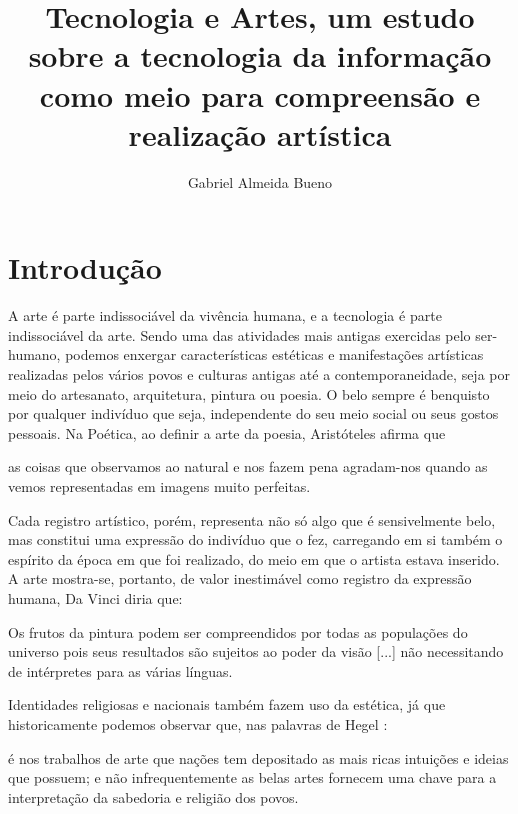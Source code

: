 \documentclass[12pt, a4paper]{article}
\author{Gabriel Almeida Bueno}
\affil{FATEC Zona Sul}
\title{Tecnologia e Artes, um estudo sobre a tecnologia da informação como meio para compreensão e realização artística}
\begin{document}
\maketitle

\section{Introdução}
A arte é parte indissociável da vivência humana, e a tecnologia é parte indissociável da arte. 
Sendo uma das atividades mais antigas exercidas pelo ser-humano, podemos enxergar características estéticas e manifestações artísticas realizadas pelos vários povos e culturas antigas até a contemporaneidade, seja por meio do artesanato, arquitetura, pintura ou poesia.
O belo sempre é benquisto por qualquer indivíduo que seja, independente do seu meio social ou seus gostos pessoais.
Na Poética, ao definir a arte da poesia, Aristóteles \cite[p.42]{aristotle_poetics} afirma que 

\begin{displayquote}
as coisas que observamos ao natural e nos fazem pena agradam-nos quando as vemos representadas em imagens muito perfeitas.
\end{displayquote}

Cada registro artístico, porém, representa não só algo que é sensivelmente belo, mas constitui uma expressão do indivíduo que o fez, carregando em si
também o espírito da época em que foi realizado, do meio em que o artista estava inserido. 
A arte mostra-se, portanto, de valor inestimável como registro da expressão humana, Da Vinci \cite{davinci_thoughtsonart} diria que:

\begin{displayquote}
Os frutos da pintura podem ser compreendidos por todas as populações do universo pois seus resultados
são sujeitos ao poder da visão [...] não necessitando de intérpretes para as várias línguas.
\end{displayquote}

Identidades religiosas e nacionais também fazem uso da estética, já que historicamente podemos observar que, nas palavras de Hegel \cite{hegel}:

\begin{displayquote}
é nos trabalhos de arte que nações tem depositado as mais ricas intuições e ideias que possuem; e não 
infrequentemente as belas artes fornecem uma chave para a interpretação da sabedoria e religião dos povos.
\end{displayquote}
\end{document}
